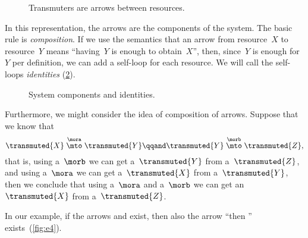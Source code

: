 
\begin{figure}[h!]
    \centering
    \caption{Transmuters are arrows between resources.}
    \label{fig:e2}
\end{figure}

In this representation, the arrows are the components of the system.
The basic rule is \emph{composition}.
If we use the semantics that an arrow from resource~$X$ to resource~$Y$ means ``having~$Y$ is enough to obtain~$X$'', then, since~$Y$ is enough for~$Y$ per definition, we can add a self-loop for each resource.
We will call the self-loops \emph{identities} (\cref{fig:e3}).

\begin{figure}[h!]
    \centering
    \caption{System components and identities. }
    \label{fig:e3}
\end{figure}


Furthermore, we might consider the idea of composition of arrows.
Suppose that we know that
%
\begin{equation}
    \transmuted{X} \stackrel{\mora}{\mto} \transmuted{Y}
    \qqand
    \transmuted{Y} \stackrel{\morb}{\mto} \transmuted{Z},
\end{equation}
%
that is, using a~$\morb$ we can get a~$\transmuted{Y}$ from a~$\transmuted{Z}$, and using a~$\mora$ we can get a~$\transmuted{X}$ from a~$\transmuted{Y}$, then we conclude that using a~$\mora$ and a~$\morb$ we can get an~$\transmuted{X}$ from a~$\transmuted{Z}$.

In our example, if the arrows \wheels  and \motor exist, then also the arrow ``\wheels then \motor'' exists~(\cref{fig:e4}).

